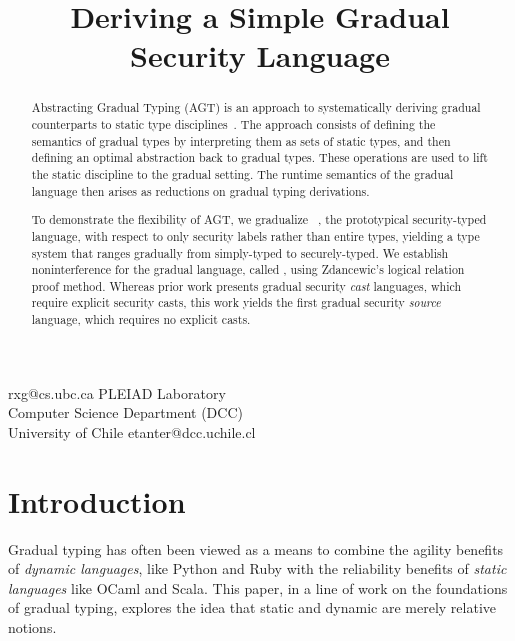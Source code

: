 \documentclass[authoryear,sort&compress,9pt,twocolumn,nocopyrightspace]{sigplanconf}
\newcommand{\lsec}{\xspace}
\newcommand{\lgsec}{\xspace}
\newcommand{\?}{\textsf{\upshape ?}} \newcommand{\consistent}[1]{\widetilde{#1}}
\begin{document}
\title{Deriving a Simple Gradual Security Language}

{rxg@cs.ubc.ca}
{PLEIAD Laboratory\\
Computer Science Department (DCC)\\
University of Chile}
{etanter@dcc.uchile.cl}

\maketitle

\begin{abstract}
  Abstracting Gradual Typing (AGT) is an approach to systematically deriving
  gradual counterparts to static type disciplines~\cite{garciaAl:popl2016}. The
  approach consists of defining the semantics of gradual types by interpreting
  them as sets of static types, and then defining an optimal abstraction back
  to gradual types. These operations are used to lift the static discipline to
  the gradual setting. The runtime semantics of the gradual language
  then arises as reductions on gradual typing derivations.

  To demonstrate the flexibility of AGT, we gradualize \linebreak
  \lsec~\cite{zdancewic},
  the prototypical security-typed language, with respect to only security
  labels rather than entire types, yielding a type system that ranges gradually
  from simply-typed to securely-typed. We establish noninterference for the
  gradual language, called \lgsec, using Zdancewic's logical relation proof
  method.  Whereas prior work presents gradual security \emph{cast} languages,
  which require explicit security casts, this work yields the first gradual
  security \emph{source} language, which requires no explicit casts.
\end{abstract}


\section{Introduction}

Gradual typing has often been viewed as a means to combine the agility benefits
of \emph{dynamic languages}, like Python and Ruby with the
reliability benefits of \emph{static languages} like OCaml and
Scala.  This paper, in a line of work on the foundations of gradual
typing, explores the idea that static and dynamic are merely relative notions.
\end{document}
